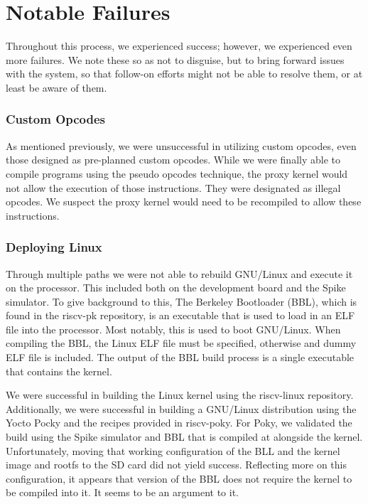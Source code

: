 \documentclass[journal]{IEEEtran}
\begin{document}
\section{Notable Failures}
Throughout this process, we experienced success; however, we experienced even more failures. We note these so as not to disguise, but to bring forward issues with the system, so that follow-on efforts might not be able to resolve them, or at least be aware of them.

\subsubsection{Custom Opcodes}
As mentioned previously, we were unsuccessful in utilizing custom opcodes, even those designed as pre-planned custom opcodes. While we were finally able to compile programs using the pseudo opcodes technique, the proxy kernel would not allow the execution of those instructions. They were designated as illegal opcodes. We suspect the proxy kernel would need to be recompiled to allow these instructions. 

\subsubsection{Deploying Linux}
Through multiple paths we were not able to rebuild GNU/Linux and execute it on the processor. This included both on the development board and the Spike simulator. To give background to this, The Berkeley Bootloader (BBL), which is found in the riscv-pk repository\cite{pk}, is an executable that is used to load in an ELF file into the processor. Most notably, this is used to boot GNU/Linux. When compiling the BBL, the Linux ELF file must be specified, otherwise and dummy ELF file is included. The output of the BBL build process is a single executable that contains the kernel.

We were successful in building the Linux kernel using the riscv-linux repository\cite{linux}. Additionally, we were successful in building a GNU/Linux distribution using the Yocto Pocky and the recipes provided in riscv-poky\cite{poky}. For Poky, we validated the build using the Spike simulator and BBL that is compiled at alongside the kernel. Unfortunately, moving that working configuration of the BLL and the kernel image and rootfs to the SD card did not yield success. Reflecting more on this configuration, it appears that version of the BBL does not require the kernel to be compiled into it. It seems to be an argument to it.
\end{document}

